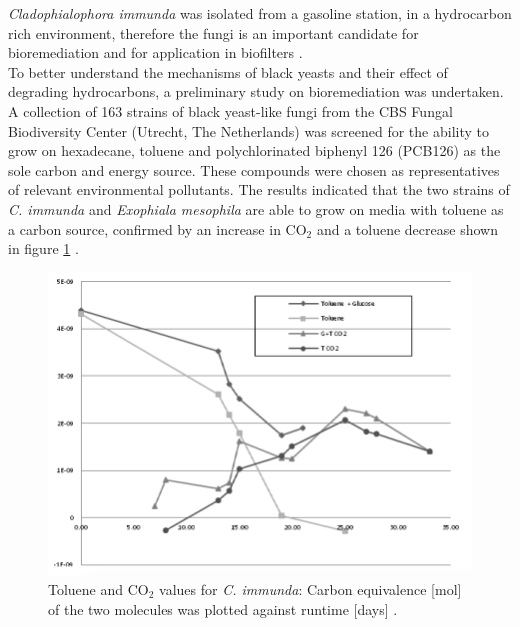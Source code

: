 \documentclass[12pt, a4paper]{report}
\begin{document}
  
\textit{Cladophialophora immunda} was isolated from a gasoline
station, in a hydrocarbon rich environment, therefore the fungi is an
important candidate for bioremediation and for application in
biofilters \cite{Prenafeta-Boldu2001}.  \\ %
To better understand the mechanisms of black yeasts and their effect of degrading
hydrocarbons, a preliminary study on bioremediation was undertaken. A collection of 163 strains of black yeast-like fungi from the CBS
Fungal Biodiversity Center (Utrecht, The Netherlands) was
screened for the ability to grow on hexadecane, toluene and
polychlorinated biphenyl 126 (PCB126) as the sole carbon and energy
source. These compounds were chosen as representatives of relevant
environmental pollutants.  The results indicated that the two strains
of \textit{C. immunda} and \textit{Exophiala mesophila} are able to
grow on media with toluene as a carbon source, confirmed by an increase
in CO$_2$ and a toluene decrease shown in figure \ref{GCresults}
\cite{BarbaraBlasi2015, Poyntner2014}.

\begin{figure}[H]
	\centering	
	\includegraphics[width=400pt]{pics/GCresults.png}
	\caption[Toluene and CO$_2$ values for \textit{C. immunda}]
	{Toluene and CO$_2$ values for \textit{C. immunda}: Carbon equivalence [mol] of the two molecules was plotted against runtime [days] \cite{Poyntner2014}. }
	\label{GCresults}
\end{figure}
\end{document}
